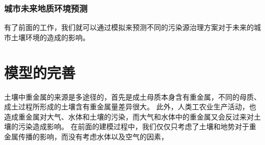 \documentclass[a4paper]{article}
\begin{document}
\section{城市未来地质环境预测}
有了前面的工作，我们就可以通过模拟来预测不同的污染源治理方案对于未来的城市土壤环境的造成的影响。
\subsection{}


\part{模型的完善}
土壤中重金属的来源是多途径的，首先是成土母质本身含有重金属，不同的母质、成土过程所形成的土壤含有重金属量差异很大。
此外，人类工农业生产活动，也造成重金属对大气、水体和土壤的污染，而大气和水体中的重金属又会反过来对土壤的污染造成影响。
在前面的建模过程中，我们仅仅只考虑了土壤和地势对于重金属传播的影响，而没有考虑水体以及空气的因素，







% 
% 
% 
% 
% 
% 
\end{document}
